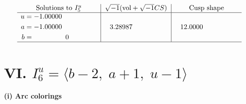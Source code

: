 \documentclass[1p]{elsarticle_modified}
\theoremstyle{definition}
\newcommand{\I}{\sqrt{-1}}
\begin{document}
$$\begin{array}{c|c|c}  
\text{Solutions to }I^u_{5}& \I (\text{vol} + \sqrt{-1}CS) & \text{Cusp shape}\\
 \hline 
\begin{aligned}
u &= -1.00000\phantom{ +0.000000I} \\
a &= -1.00000\phantom{ +0.000000I} \\
b &= \phantom{-0.000000 } 0\end{aligned}
 & \phantom{-}3.28987\phantom{ +0.000000I} & \phantom{-}12.0000\phantom{ +0.000000I}\\
 \hline 
 \end{array}$$\newpage\newpage\renewcommand{\arraystretch}{1}
\centering \section*{VI. $I^u_{6}= \langle b-2,\;a+1,\;u-1 \rangle$}
\flushleft \textbf{(i) Arc colorings}\\
\end{document}
